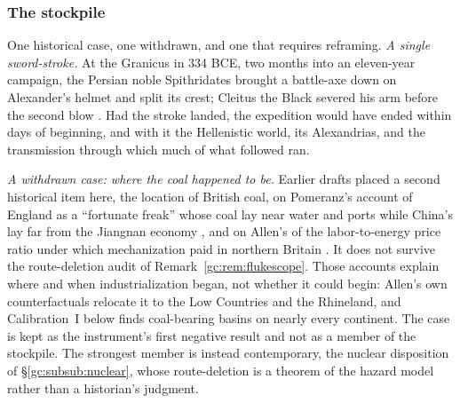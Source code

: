\subsubsection{The stockpile}\label{gc:subsub:stockpile}

One historical case, one withdrawn, and one that requires reframing. \emph{A single sword-stroke.} At the Granicus in 334 BCE, two months
into an eleven-year campaign, the Persian noble Spithridates brought a
battle-axe down on Alexander's helmet and split its crest; Cleitus the
Black severed his arm before the second blow \cite{Arrian,PlutarchAlex}. Had the stroke landed, the expedition would have ended
within days of beginning, and with it the Hellenistic world, its
Alexandrias, and the transmission through which much of what followed
ran.

\emph{A withdrawn case: where the coal happened to be.} Earlier drafts
placed a second historical item here, the location of British coal, on
Pomeranz's account of England as a ``fortunate freak'' whose coal lay
near water and ports while China's lay far from the Jiangnan economy
\cite{Pomeranz00}, and on Allen's of the labor-to-energy price ratio
under which mechanization paid in northern Britain \cite{Allen09}. It
does not survive the route-deletion audit of
Remark~\ref{gc:rem:flukescope}. Those accounts explain where and when
industrialization began, not whether it could begin: Allen's own
counterfactuals relocate it to the Low Countries and the Rhineland, and
Calibration~I below finds coal-bearing basins on nearly every continent.
The case is kept as the instrument's first negative result and not as a
member of the stockpile. The strongest member is instead contemporary,
the nuclear disposition of \S\ref{gc:subsub:nuclear}, whose
route-deletion is a theorem of the hazard model rather than a
historian's judgment.

